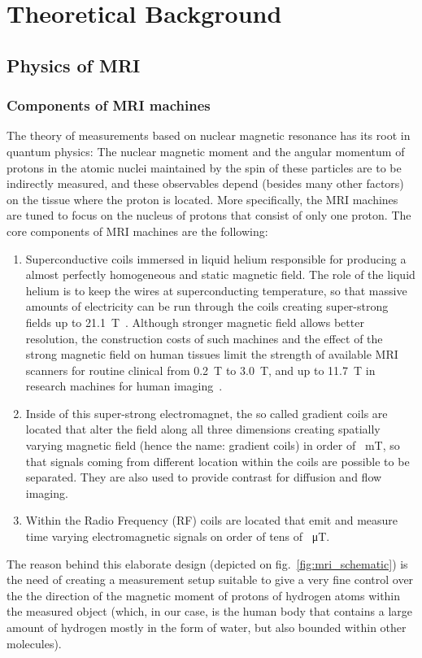 \chapter{Theoretical Background}

\section{Physics of MRI}
\subsection{Components of MRI machines}
The theory of measurements based on nuclear magnetic resonance has its root in quantum physics: The nuclear magnetic moment and the angular momentum of protons in the atomic nuclei maintained by the spin of these particles are to be indirectly measured, and these observables depend (besides many other factors) on the tissue where the proton is located. More specifically, the MRI
machines are tuned to focus on the nucleus of protons that consist of only one proton. The core components of MRI machines are the following:
\begin{enumerate}
    \item Superconductive coils immersed in liquid helium responsible for producing a almost perfectly homogeneous and static magnetic field. The role of the liquid helium is to keep the wires at superconducting temperature, so that massive amounts of electricity can be run through the coils creating super-strong fields up to \SI{21.1}{\tesla}~\cite{schepkin_vivo_2012}. Although stronger magnetic field allows better resolution, the construction costs of such machines and the effect of the strong magnetic field on human tissues limit the strength of available MRI scanners for routine clinical from \SI{0.2}{\tesla} to \SI{3.0}{\tesla}, and up to \SI{11.7}{\tesla} in research machines for human imaging~\cite{ladd_pros_2018}.
    \item Inside of this super-strong electromagnet, the so called gradient coils are located that alter the field along all three dimensions creating spatially varying magnetic field (hence the name: gradient coils) in order of \SI{}{\milli\tesla}, so that signals coming from different location within the coils are possible to be separated. They are also used to provide contrast for diffusion and flow imaging.
    \item Within the Radio Frequency (RF) coils are located that emit and measure time varying electromagnetic signals on order of tens of \SI{}{\micro\tesla}.
\end{enumerate}
The reason behind this elaborate design (depicted on fig.~\ref{fig:mri_schematic}) is the need of creating a measurement setup suitable to give a very fine control over the the direction of the magnetic moment of protons of hydrogen atoms within the measured object (which, in our case, is the human body that contains a large amount of hydrogen mostly in the form of water, but also bounded within other molecules).

